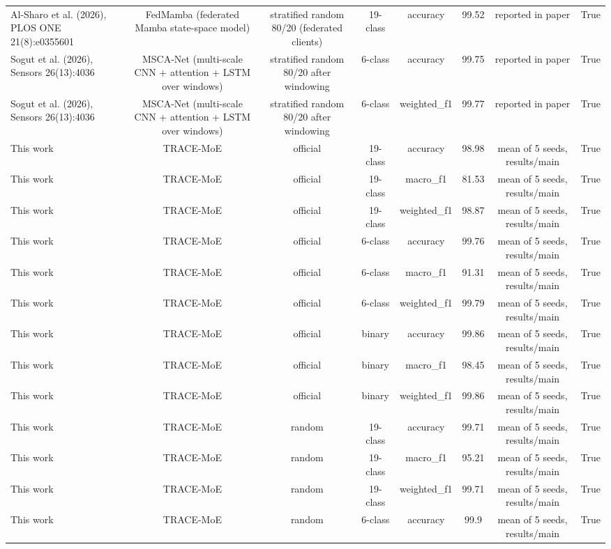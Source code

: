 \begin{table}[htbp]
\begin{tabular}{lccccccc}
Al-Sharo et al. (2026), PLOS ONE 21(8):e0355601 & FedMamba (federated Mamba state-space model) & stratified random 80/20 (federated clients) & 19-class & accuracy & 99.52 & reported in paper & True \\
Sogut et al. (2026), Sensors 26(13):4036 & MSCA-Net (multi-scale CNN + attention + LSTM over windows) & stratified random 80/20 after windowing & 6-class & accuracy & 99.75 & reported in paper & True \\
Sogut et al. (2026), Sensors 26(13):4036 & MSCA-Net (multi-scale CNN + attention + LSTM over windows) & stratified random 80/20 after windowing & 6-class & weighted\_f1 & 99.77 & reported in paper & True \\
This work & TRACE-MoE & official & 19-class & accuracy & 98.98 & mean of 5 seeds, results/main & True \\
This work & TRACE-MoE & official & 19-class & macro\_f1 & 81.53 & mean of 5 seeds, results/main & True \\
This work & TRACE-MoE & official & 19-class & weighted\_f1 & 98.87 & mean of 5 seeds, results/main & True \\
This work & TRACE-MoE & official & 6-class & accuracy & 99.76 & mean of 5 seeds, results/main & True \\
This work & TRACE-MoE & official & 6-class & macro\_f1 & 91.31 & mean of 5 seeds, results/main & True \\
This work & TRACE-MoE & official & 6-class & weighted\_f1 & 99.79 & mean of 5 seeds, results/main & True \\
This work & TRACE-MoE & official & binary & accuracy & 99.86 & mean of 5 seeds, results/main & True \\
This work & TRACE-MoE & official & binary & macro\_f1 & 98.45 & mean of 5 seeds, results/main & True \\
This work & TRACE-MoE & official & binary & weighted\_f1 & 99.86 & mean of 5 seeds, results/main & True \\
This work & TRACE-MoE & random & 19-class & accuracy & 99.71 & mean of 5 seeds, results/main & True \\
This work & TRACE-MoE & random & 19-class & macro\_f1 & 95.21 & mean of 5 seeds, results/main & True \\
This work & TRACE-MoE & random & 19-class & weighted\_f1 & 99.71 & mean of 5 seeds, results/main & True \\
This work & TRACE-MoE & random & 6-class & accuracy & 99.9 & mean of 5 seeds, results/main & True \\

\end{tabular}
\end{table}
